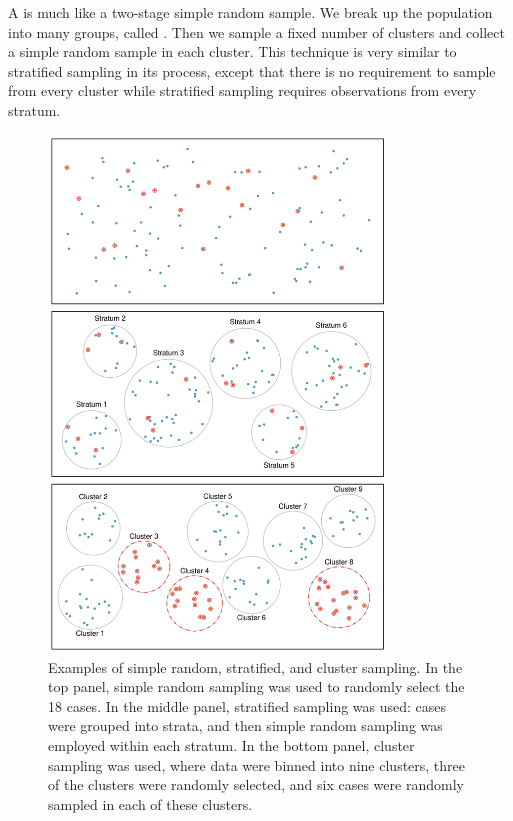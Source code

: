 A  is much like a two-stage simple random sample. We break up the population into many groups, called . Then we sample a fixed number of clusters and collect a simple random sample in each cluster. This technique is very similar to stratified sampling in its process, except that there is no requirement to sample from every cluster while stratified sampling requires observations from every stratum.
\begin{figure}
\centering
\includegraphics[width=0.8\textwidth]{01/figures/samplingMethodsFigure/samplingMethodsFigure}
\caption{Examples of simple random, stratified, and cluster sampling. In the top panel, simple random sampling was used to randomly select the 18 cases. In the middle panel, stratified sampling was used: cases were grouped into strata, and then simple random sampling was employed within each stratum. In the bottom panel, cluster sampling was used, where data were binned into nine clusters, three of the clusters were randomly selected, and six cases were randomly sampled in each of these clusters.}
\label{samplingMethodsFigure}
\end{figure}

